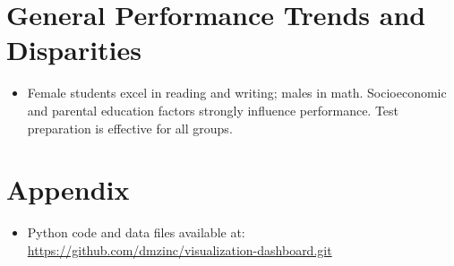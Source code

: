 \documentclass[12pt]{article}
\begin{document}
\section{General Performance Trends and Disparities}
\begin{itemize}
    \item Female students excel in reading and writing; males in math. Socioeconomic and parental education factors strongly influence performance. Test preparation is effective for all groups.
\end{itemize}

\section{Appendix}
\begin{itemize}
    \item Python code and data files available at: \url{https://github.com/dmzinc/visualization-dashboard.git}
\end{itemize}
\end{document}
